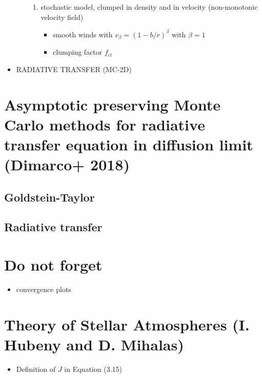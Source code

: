 \documentclass[../main/main.tex]{subfiles}
\begin{document}
\begin{itemize}
\begin{itemize}
\begin{enumerate}
\item stochastic model, clumped in density and in velocity (non-monotonic velocity field)
\begin{itemize}
\item smooth winds with $v_{\beta} = (1-b/r)^{\beta}$ with $\beta = 1$
\item clumping factor $f_{cl}$
\end{itemize}
\end{enumerate}

\end{itemize}

\item RADIATIVE TRANSFER (MC-2D)
\end{itemize}

\newpage
\section{Asymptotic preserving Monte Carlo methods for radiative transfer equation in diffusion limit (Dimarco+ 2018)}
\subsection{Goldstein-Taylor}
\subsection{Radiative transfer}

\newpage
\section{Do not forget}
\begin{itemize}
\item convergence plots
\end{itemize}

\section{Theory of Stellar Atmospheres (I. Hubeny and D. Mihalas)}
\begin{itemize}
\item Definition of $J$ in Equation (3.15)
\end{itemize}
\end{document}
